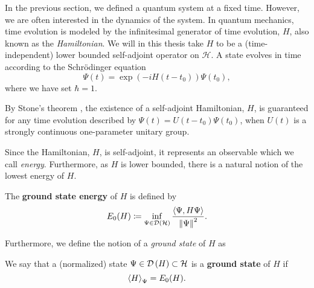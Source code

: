 In the previous section, we defined a quantum system at a fixed time. However, we are often interested in the dynamics of the system. In quantum mechanics, time evolution is modeled by the infinitesimal generator of time evolution, $ H $, also known as the \emph{Hamiltonian}. We will in this thesis take $ H $ to be a (time-independent) lower bounded self-adjoint operator on $ \mathcal{H} $. A state evolves in time according to the Schr\"odinger equation\begin{equation*}
\Psi(t)=\exp\left(-iH(t-t_0)\right)\Psi(t_0),
\end{equation*}
where we have set $ \hbar=1 $.
\begin{remark}
	By Stone's theorem \cite{reed1981functional}, the existence of a self-adjoint Hamiltonian, $ H $, is guaranteed for any time evolution described by $ \Psi(t)=U(t-t_0)\Psi(t_0) $, when $ U(t) $ is a strongly continuous one-parameter unitary group.
\end{remark}
Since the Hamiltonian, $ H $, is self-adjoint, it represents an observable which we call \emph{energy}. Furthermore, as $ H $ is lower bounded, there is a natural notion of the lowest energy of $ H $.
\begin{definition}\label{DefinitionGroundStateEnergy}
	The \textbf{ground state energy} of $ H $ is defined by 
	\begin{equation}\label{EqVariationalGroundStateEnergyOperator}
	E_0(H)\coloneqq\inf_{\Psi\in \mathcal D\left(\mathcal{H}\right)}\frac{\left\langle\Psi,H\Psi\right\rangle}{\left\lVert \Psi \right\rVert^2}.
	\end{equation}
\end{definition}
Furthermore, we define the notion of a \emph{ground state} of $ H $ as
\begin{definition}
	We say that a (normalized) state $ \Psi\in \mathcal D\left(H\right)\subset \mathcal{H} $ is a \textbf{ground state} of $ H $ if $$ \left\langle H\right\rangle_\Psi=E_0(H). $$
\end{definition}


